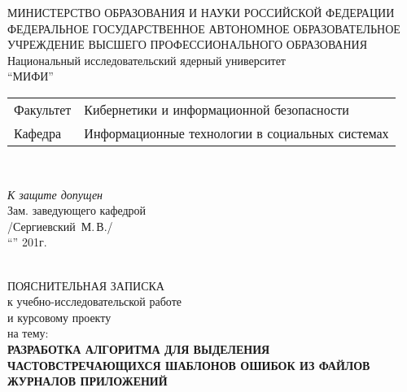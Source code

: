 \begin{titlepage}
  \begin{center}

    МИНИСТЕРСТВО ОБРАЗОВАНИЯ И НАУКИ РОССИЙСКОЙ ФЕДЕРАЦИИ
    ФЕДЕРАЛЬНОЕ ГОСУДАРСТВЕННОЕ АВТОНОМНОЕ ОБРАЗОВАТЕЛЬНОЕ УЧРЕЖДЕНИЕ
    ВЫСШЕГО ПРОФЕССИОНАЛЬНОГО ОБРАЗОВАНИЯ \\[1em]
    Национальный исследовательский ядерный университет\\
    ``МИФИ'' \\[1em]

    \begin{minipage}{\textwidth}
      \begin{flushleft}
        \begin{tabular}{ l l }
          Факультет & Кибернетики и информационной безопасности\\
          Кафедра   & Информационные технологии в социальных системах
        \end{tabular}
      \end{flushleft}
    \end{minipage}\\[1em]

    \begin{minipage}{\textwidth}
      \begin{flushright}
        \textit{К защите допущен}\\
        Зам. заведующего кафедрой\\
        \underline{\hspace*{3.0cm}} /Сергиевский~М.\,В./\\
        ``\underline{\hspace*{1.5cm}}''
        \underline{\hspace*{4.0cm}}
        201\underline{\hspace*{0.5cm}}г.
      \end{flushright}
    \end{minipage}\\[3em]

    {ПОЯСНИТЕЛЬНАЯ ЗАПИСКА}\\
    {к учебно-исследовательской работе}\\
    {и курсовому проекту}\\
    {на тему:}\\[1em]
    \textbf{РАЗРАБОТКА АЛГОРИТМА ДЛЯ ВЫДЕЛЕНИЯ ЧАСТОВСТРЕЧАЮЩИХСЯ ШАБЛОНОВ
      ОШИБОК ИЗ ФАЙЛОВ ЖУРНАЛОВ ПРИЛОЖЕНИЙ}\\[1em]


    \vfill


\end{center}
\end{titlepage}
